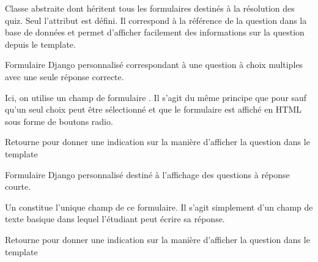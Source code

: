 \documentclass[a4paper,11pt,openany,oneside]{sphinxmanual}
\begin{document}

\begin{fulllineitems}
\label{source:quiz.forms.QuestionForm}
Classe abstraite dont héritent tous les formulaires destinés à la résolution
des quiz. Seul l'attribut  est défini. Il correspond à la référence
de la question dans la base de données et permet d'afficher facilement des informations
sur la question depuis le template.

\end{fulllineitems}


\begin{fulllineitems}
\label{source:quiz.forms.RadioForm}
Formulaire Django personnalisé correspondant à une question à choix multiples
avec une seule réponse correcte.

Ici, on utilise un champ de formulaire . Il s'agit du même principe
que pour {\hyperref[source:quiz.forms.CheckboxForm]{\emph{}}} sauf qu'un seul choix peut être sélectionné et
que le formulaire est affiché en HTML sous forme de boutons radio.

\begin{fulllineitems}
\label{source:quiz.forms.RadioForm.get_type}
Retourne  pour donner une indication sur la manière d'afficher 
la question dans le template

\end{fulllineitems}


\end{fulllineitems}


\begin{fulllineitems}
\label{source:quiz.forms.TextForm}
Formulaire Django personnalisé destiné à l'affichage des questions à réponse courte.

Un  constitue l'unique champ de ce formulaire. Il s'agit simplement
d'un champ de texte basique dans lequel l'étudiant peut écrire sa réponse.

\begin{fulllineitems}
\label{source:quiz.forms.TextForm.get_type}
Retourne  pour donner une indication sur la manière d'afficher 
la question dans le template

\end{fulllineitems}


\end{fulllineitems}
\end{document}
